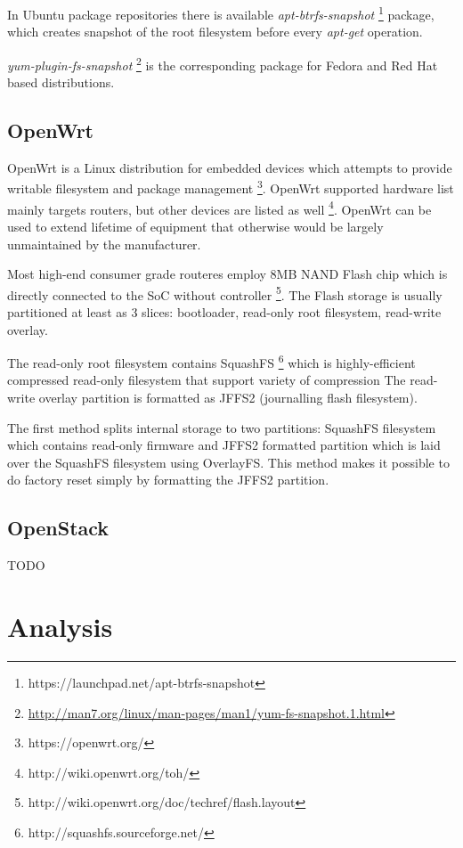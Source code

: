 \documentclass{article}
\begin{document}
In Ubuntu package repositories there is available \emph{apt-btrfs-snapshot}
\footnote{https://launchpad.net/apt-btrfs-snapshot} package,
which creates snapshot of the root filesystem before every
\emph{apt-get} operation.

\emph{yum-plugin-fs-snapshot}
\footnote{\url{http://man7.org/linux/man-pages/man1/yum-fs-snapshot.1.html}}
is the corresponding package for Fedora and
Red Hat based distributions.


\subsection{OpenWrt}
OpenWrt is a Linux distribution for embedded devices which attempts to provide
writable filesystem and package management \footnote{https://openwrt.org/}.
OpenWrt supported hardware list mainly targets routers, but other devices are
listed as well \footnote{http://wiki.openwrt.org/toh/}. OpenWrt can be used to
extend lifetime of equipment that otherwise would be largely unmaintained by the
manufacturer.

Most high-end consumer grade routeres employ 8MB NAND Flash chip which is
directly connected to the SoC without controller
\footnote{http://wiki.openwrt.org/doc/techref/flash.layout}.
The Flash storage is usually partitioned at least as 3 slices:
bootloader, read-only root filesystem, read-write overlay.

The read-only root filesystem contains SquashFS
\footnote{http://squashfs.sourceforge.net/}
which is highly-efficient compressed read-only filesystem that support variety
of compression The read-write overlay partition is formatted as JFFS2
(journalling flash filesystem).

The first method splits internal storage to two partitions: SquashFS
filesystem which contains read-only firmware and JFFS2 formatted partition
which is laid over the SquashFS filesystem using OverlayFS. This method makes
it possible to do factory reset simply by formatting the JFFS2 partition.

\subsection{OpenStack}

TODO

\section{Analysis}
\end{document}
